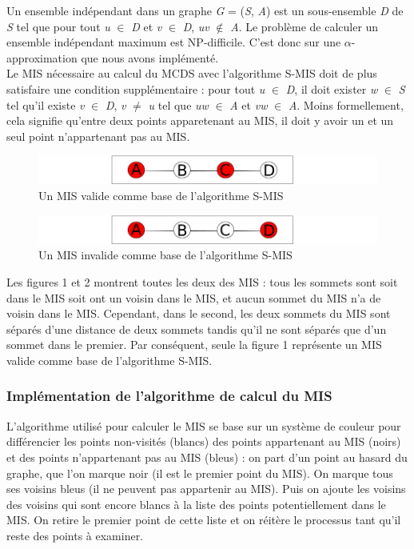 \documentclass[]{report}
\begin{document}
Un ensemble indépendant dans un graphe \emph{G} = (\emph{S}, \emph{A})
est un sous-ensemble \emph{D} de \emph{S} tel que pour tout \emph{u}
\(\in\) \emph{D} et \emph{v} \(\in\) \emph{D}, \emph{uv} \(\notin\)
\emph{A}. Le problème de calculer un ensemble indépendant maximum est
NP-difficile. C'est donc sur une \(\alpha\)-approximation que nous avons
implémenté.\\
Le MIS nécessaire au calcul du MCDS avec l'algorithme S-MIS doit de plus
satisfaire une condition supplémentaire : pour tout \emph{u} \(\in\)
\emph{D}, il doit exister \emph{w} \(\in\) \emph{S} tel qu'il existe
\emph{v} \(\in\) \emph{D}, \emph{v} \(\neq\) \emph{u} tel que \emph{uw}
\(\in\) \emph{A} et \emph{vw} \(\in\) \emph{A}. Moins formellement, cela
signifie qu'entre deux points apparetenant au MIS, il doit y avoir un et
un seul point n'appartenant pas au MIS.

\begin{figure}
\centering
\includegraphics{img/fig1.png}
\caption{Un MIS valide comme base de l'algorithme S-MIS}
\end{figure}

\begin{figure}
\centering
\includegraphics{img/fig2.png}
\caption{Un MIS invalide comme base de l'algorithme S-MIS}
\end{figure}

Les figures 1 et 2 montrent toutes les deux des MIS : tous les sommets
sont soit dans le MIS soit ont un voisin dans le MIS, et aucun sommet du
MIS n'a de voisin dans le MIS. Cependant, dans le second, les deux
sommets du MIS sont séparés d'une distance de deux sommets tandis qu'il
ne sont séparés que d'un sommet dans le premier. Par conséquent, seule
la figure 1 représente un MIS valide comme base de l'algorithme S-MIS.

\subsubsection{Implémentation de l'algorithme de calcul du
MIS}\label{impluxe9mentation-de-lalgorithme-de-calcul-du-mis}

L'algorithme utilisé pour calculer le MIS se base sur un système de
couleur pour différencier les points non-visités (blancs) des points
appartenant au MIS (noirs) et des points n'appartenant pas au MIS
(bleus) : on part d'un point au hasard du graphe, que l'on marque noir
(il est le premier point du MIS). On marque tous ses voisins bleus (il
ne peuvent pas appartenir au MIS). Puis on ajoute les voisins des
voisins qui sont encore blancs à la liste des points potentiellement
dans le MIS. On retire le premier point de cette liste et on réitère le
processus tant qu'il reste des points à examiner.
\end{document}
